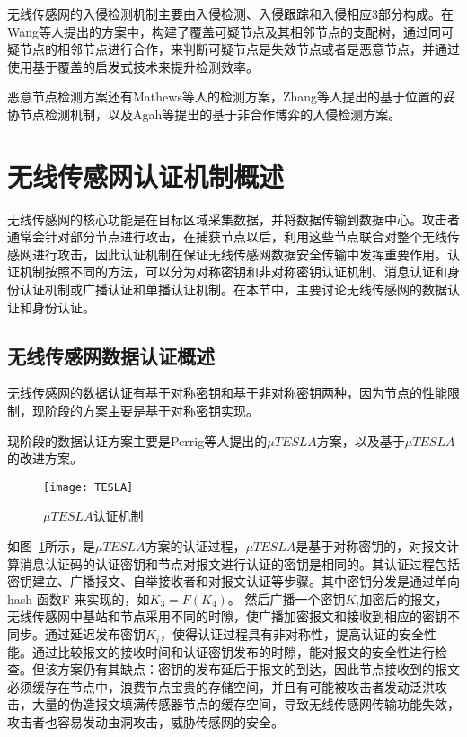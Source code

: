 无线传感网的入侵检测机制主要由入侵检测、入侵跟踪和入侵相应3部分构成。在Wang等人提出的方案中，构建了覆盖可疑节点及其相邻节点的支配树，通过同可疑节点的相邻节点进行合作，来判断可疑节点是失效节点或者是恶意节点，并通过使用基于覆盖的启发式技术来提升检测效率。

恶意节点检测方案还有Mathews等人的检测方案，Zhang等人提出的基于位置的妥协节点检测机制，以及Agah等提出的基于非合作博弈的入侵检测方案。

\section{无线传感网认证机制概述}
无线传感网的核心功能是在目标区域采集数据，并将数据传输到数据中心。攻击者通常会针对部分节点进行攻击，在捕获节点以后，利用这些节点联合对整个无线传感网进行攻击，因此认证机制在保证无线传感网数据安全传输中发挥重要作用。认证机制按照不同的方法，可以分为对称密钥和非对称密钥认证机制、消息认证和身份认证机制或广播认证和单播认证机制。在本节中，主要讨论无线传感网的数据认证和身份认证。

\subsection{无线传感网数据认证概述}
无线传感网的数据认证有基于对称密钥和基于非对称密钥两种，因为节点的性能限制，现阶段的方案主要是基于对称密钥实现。

现阶段的数据认证方案主要是Perrig等人提出的$\mu TESLA$方案，以及基于$\mu TESLA$的改进方案。
\begin{figure}[htbp]
  \centering
  \texttt{[image: TESLA]}
  \caption{$\mu TESLA$认证机制}
  \label{fig:TESLA}
\end{figure}
如图~\ref{fig:TESLA}所示，是$\mu TESLA$方案的认证过程，$\mu TESLA$是基于对称密钥的，对报文计算消息认证码的认证密钥和节点对报文进行认证的密钥是相同的。其认证过程包括密钥建立、广播报文、自举接收者和对报文认证等步骤。其中密钥分发是通过单向hash 函数F 来实现的，如$K_3=F(K_4)$。 然后广播一个密钥$K_i$加密后的报文，无线传感网中基站和节点采用不同的时隙，使广播加密报文和接收到相应的密钥不同步。通过延迟发布密钥$K_i$，使得认证过程具有非对称性，提高认证的安全性能。通过比较报文的接收时间和认证密钥发布的时隙，能对报文的安全性进行检查。但该方案仍有其缺点：密钥的发布延后于报文的到达，因此节点接收到的报文必须缓存在节点中，浪费节点宝贵的存储空间，并且有可能被攻击者发动泛洪攻击，大量的伪造报文填满传感器节点的缓存空间，导致无线传感网传输功能失效，攻击者也容易发动虫洞攻击，威胁传感网的安全。

